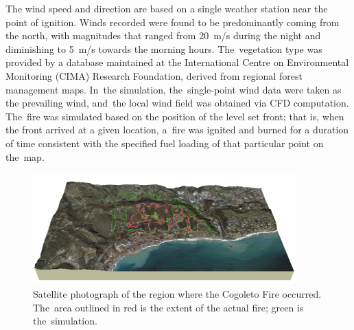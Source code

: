 \documentclass[atmosphere,article,accept,moreauthors,pdftex]{Definitions/mdpi}
\begin{document}
\begin{paracol}{2}
The wind speed and direction are based on a single weather station near the point of ignition. Winds recorded were found to be predominantly coming from the north, with magnitudes that ranged from 20~m/s during the night and diminishing to 5~m/s towards the morning hours. The~vegetation type was provided by a database maintained at the International Centre on Environmental Monitoring (CIMA) %
Research Foundation, derived from regional forest management maps. In~the simulation, the~single-point wind data were taken as the prevailing wind, and~the local wind field was obtained via  CFD computation. The~fire was simulated based on the position of the level set front; that is, when the front arrived at a given location, a~fire was ignited and burned for a duration of time consistent with the specified fuel loading of that particular point on the~map. 

\end{paracol}
\nointerlineskip
\begin{figure}[H]
\vspace{-12pt}
\widefigure
\includegraphics[width=0.9\textwidth]{figures/cogoleto_fire_2019_ls4_1000.png}
\caption{Satellite photograph of the region where the Cogoleto Fire occurred. The~area outlined in red is the extent of the actual fire; green is the~simulation.}
\label{Cogoleto_satellite}
\end{figure}
\end{document}
